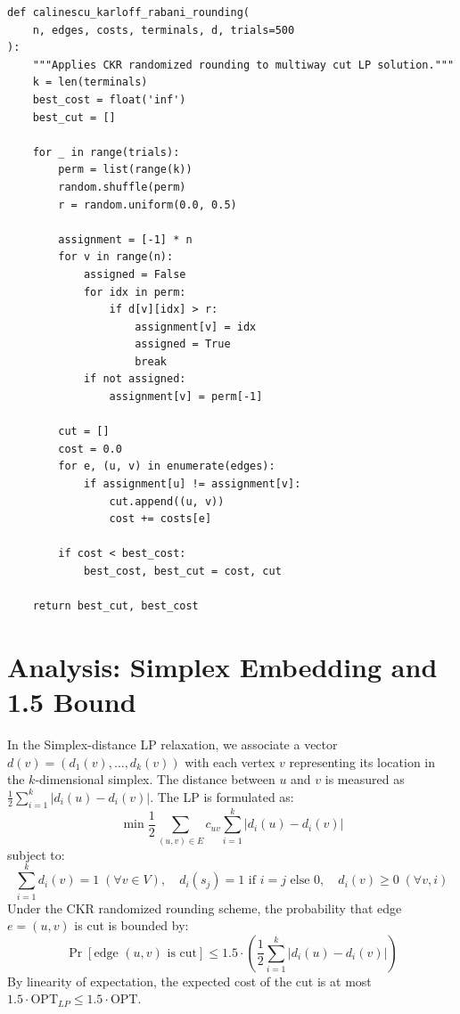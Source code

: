 \documentclass[11pt,oneside]{book}
\begin{document}
\begin{lstlisting}[style=python, caption=CKR Randomized Rounding for Multiway Cut]
def calinescu_karloff_rabani_rounding(
    n, edges, costs, terminals, d, trials=500
):
    """Applies CKR randomized rounding to multiway cut LP solution."""
    k = len(terminals)
    best_cost = float('inf')
    best_cut = []
    
    for _ in range(trials):
        perm = list(range(k))
        random.shuffle(perm)
        r = random.uniform(0.0, 0.5)
        
        assignment = [-1] * n
        for v in range(n):
            assigned = False
            for idx in perm:
                if d[v][idx] > r:
                    assignment[v] = idx
                    assigned = True
                    break
            if not assigned:
                assignment[v] = perm[-1]
                
        cut = []
        cost = 0.0
        for e, (u, v) in enumerate(edges):
            if assignment[u] != assignment[v]:
                cut.append((u, v))
                cost += costs[e]
                
        if cost < best_cost:
            best_cost, best_cut = cost, cut
            
    return best_cut, best_cost
\end{lstlisting}

\section{Analysis: Simplex Embedding and 1.5 Bound}
In the Simplex-distance LP relaxation, we associate a vector $d(v) = (d_1(v), \dots, d_k(v))$ with each vertex $v$ representing its location in the $k$-dimensional simplex.
The distance between $u$ and $v$ is measured as $\frac{1}{2} \sum_{i=1}^k |d_i(u) - d_i(v)|$.
The LP is formulated as:
\[
\min \frac{1}{2} \sum_{(u,v) \in E} c_{uv} \sum_{i=1}^k |d_i(u) - d_i(v)|
\]
subject to:
\[
\sum_{i=1}^k d_i(v) = 1 \; (\forall v \in V), \quad d_i(s_j) = 1 \text{ if } i = j \text{ else } 0, \quad d_i(v) \ge 0 \; (\forall v, i)
\]
Under the CKR randomized rounding scheme, the probability that edge $e=(u,v)$ is cut is bounded by:
\[
\Pr[\text{edge } (u,v) \text{ is cut}] \le 1.5 \cdot \left( \frac{1}{2} \sum_{i=1}^k |d_i(u) - d_i(v)| \right)
\]
By linearity of expectation, the expected cost of the cut is at most $1.5 \cdot \text{OPT}_{LP} \le 1.5 \cdot \text{OPT}$.
\end{document}
